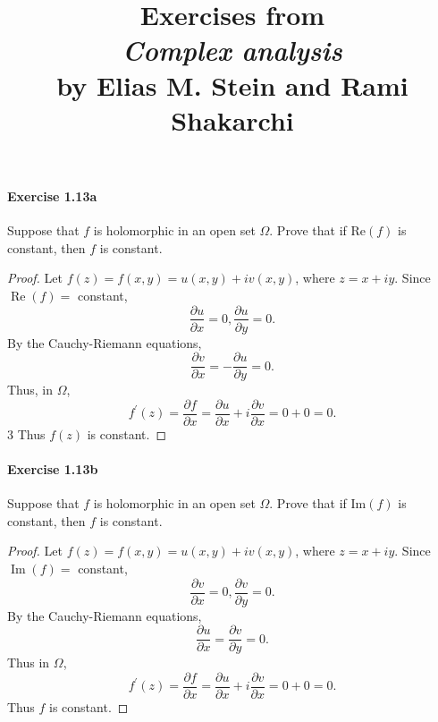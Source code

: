 \documentclass{article}
\title{\textbf{
Exercises from \\
\textit{Complex analysis} \\
by Elias M. Stein and Rami Shakarchi
}}
\date{}
\begin{document}
\maketitle


\paragraph{Exercise 1.13a} Suppose that $f$ is holomorphic in an open set $\Omega$. Prove that if $\text{Re}(f)$ is constant, then $f$ is constant.
\begin{proof}
Let $f(z)=f(x, y)=u(x, y)+i v(x, y)$, where $z=x+i y$.
Since $\operatorname{Re}(f)=$ constant,
$$
\frac{\partial u}{\partial x}=0, \frac{\partial u}{\partial y}=0 .
$$
By the Cauchy-Riemann equations,
$$
\frac{\partial v}{\partial x}=-\frac{\partial u}{\partial y}=0 .
$$
Thus, in $\Omega$,
$$
f^{\prime}(z)=\frac{\partial f}{\partial x}=\frac{\partial u}{\partial x}+i \frac{\partial v}{\partial x}=0+0=0 .
$$
3
Thus $f(z)$ is constant.
\end{proof}



\paragraph{Exercise 1.13b} Suppose that $f$ is holomorphic in an open set $\Omega$. Prove that if $\text{Im}(f)$ is constant, then $f$ is constant.
\begin{proof}
Let $f(z)=f(x, y)=u(x, y)+i v(x, y)$, where $z=x+i y$.
Since $\operatorname{Im}(f)=$ constant,
$$
\frac{\partial v}{\partial x}=0, \frac{\partial v}{\partial y}=0 .
$$
By the Cauchy-Riemann equations,
$$
\frac{\partial u}{\partial x}=\frac{\partial v}{\partial y}=0 .
$$
Thus in $\Omega$,
$$
f^{\prime}(z)=\frac{\partial f}{\partial x}=\frac{\partial u}{\partial x}+i \frac{\partial v}{\partial x}=0+0=0 .
$$
Thus $f$ is constant.
\end{proof}
\end{document}
